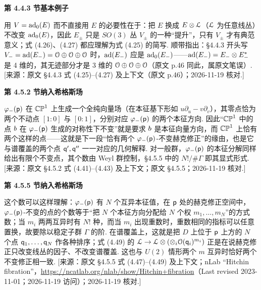 \medskip\noindent\textbf{第 4.4.3 节\quad 基本例子}\par\nopagebreak
\begin{description}[leftmargin=5.8em,labelwidth=5em,labelsep=0.6em,itemsep=0.15ex,topsep=0.2ex]
\item[4.4.3-1] 用 $V={\rm ad}_0(E)$ 而不直接用 $E$ 的必要性在于：把 $E$ 换成 $E\otimes{\mathcal L}$（${\mathcal L}$ 为任意线丛）不改变 ${\rm ad}_0(E)$，因此 $E_\pm$ 只是 $SO(3)$ 丛 $V_\pm$ 的一种“提升”，只有 $V_\pm$ 才有典范意义；式 (4.26)、(4.27) 都应理解为式 (4.25) 的简写. 顺带指出：§4.4.3 开头写 $V_-={\rm ad}(E_-)={\mathcal O}\oplus{\mathcal O}\oplus{\mathcal O}$ 时，${\rm ad}(E_-)$ 应是 ${\rm ad}_0(E_-)$——${\rm ad}(E_-)=E_-\otimes E_-^*$ 是 4 维的，其无迹部分才是 3 维的 ${\mathcal O}\oplus{\mathcal O}\oplus{\mathcal O}$（原文 p.46 同此，属原文笔误）. [来源：原文 §4.4.3 式 (4.25)–(4.27) 及上下文（原文 p.46）；2026-11-19 核对.]
\end{description}
\medskip\noindent\textbf{第 4.5.2 节\quad 纳入希格斯场}\par\nopagebreak
\begin{description}[leftmargin=5.8em,labelwidth=5em,labelsep=0.6em,itemsep=0.15ex,topsep=0.2ex]
\item[4.5.2-1] $\varphi_-({\sf p})$ 在 ${\mathbb{CP}}^1$ 上生成一个全纯向量场（在本征基下形如 $u\partial_u-v\partial_v$），其零点恰为两个不动点 $[1:0]$ 与 $[0:1]$，分别对应 $\varphi_-({\sf p})$ 的两个本征方向. 因此“${\mathbb{CP}}^1$ 中的点 $b$ 在 $\varphi_-({\sf p})$ 生成的对称性下不变”就是要求 $b$ 是本征向量方向，而 ${\mathbb{CP}}^1$ 上恰有两个这样的点——这就是下一段“恰有两个 $\varphi_-({\sf p})$-不变赫克修正”的缘由，也是它与谱覆盖的两个点 ${\sf q}',{\sf q}''$ 一一对应的几何解释. 对一般群，$\varphi_-({\sf p})$ 的本征分解同样给出有限个不变点，其个数由 Weyl 群控制，§4.5.5 中的 $N!/\#\Gamma$ 即其显式形式. [来源：原文 §4.5.2 式 (4.41)–(4.43) 及上下文；原文 §4.5.5；2026-11-19 核对.]
\end{description}
\medskip\noindent\textbf{第 4.5.5 节\quad 纳入希格斯场}\par\nopagebreak
\begin{description}[leftmargin=5.8em,labelwidth=5em,labelsep=0.6em,itemsep=0.15ex,topsep=0.2ex]
\item[4.5.5-1] 这个数可以这样理解：$\varphi_-({\sf p})$ 有 $N$ 个互异本征值，在 ${\sf p}$ 处的赫克修正空间中，$\varphi_-({\sf p})$-不变的点的个数等于“把 $N$ 个本征方向分配给 $N$ 个权 $m_1,\dots,m_N$”的方式数；当 $m_i$ 两两互异时有 $N!$ 种，而当 $m_i$ 出现重数时，重数相同的指标可以任意置换，故要除以稳定子群 $\Gamma$ 的阶. 在谱覆盖上，这就是把 $D$ 上位于 ${\sf p}$ 上方的 $N$ 个点 ${\sf q}_1,\dots,{\sf q}_N$ 作各种排序；式 (4.49) 的 ${\mathcal L}\to {\mathcal L}\otimes(\otimes_i{\mathcal O}({\sf q}_i)^{m_i})$ 正是在说赫克修正只改变线丛的因子、不改变谱覆盖. 这也与 $U(2)$ 情形两个 $m$ 互异时恰好两个不变修正相一致. [来源：原文 §4.5.5 式 (4.47)–(4.49) 及上下文；nLab “Hitchin fibration”，\url{https://ncatlab.org/nlab/show/Hitchin+fibration}（Last revised 2023-11-01；2026-11-19 访问）；2026-11-19 核对.]
\end{description}
